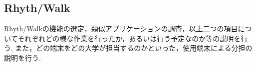 \subsection{Rhyth/Walk}
\par
Rhyth/Walkの機能の選定，類似アプリケーションの調査，以上二つの項目についてそれぞれどの様な作業を行ったか，あるいは行う予定なのか等の説明を行う.
また，どの端末をどの大学が担当するのかといった，使用端末による分担の説明を行う.
